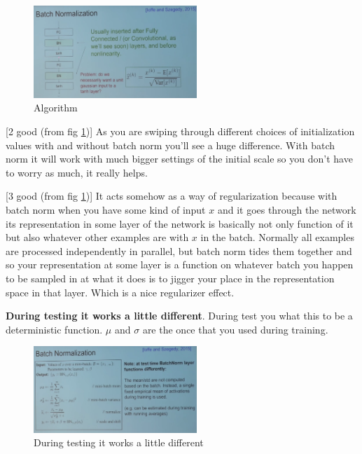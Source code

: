 \begin{figure}[h]
  \centering
  \includegraphics[width=0.55\textwidth]{Images/bn_layer/4.png}
  \caption{Algorithm}
  \label{fig:bn_layer_algorithm}
\end{figure}


[2 good (from fig \ref{fig:bn_layer_algorithm})] As you are swiping through different choices of initialization values with and without batch norm you'll see a huge difference. With batch norm it will work with much bigger settings of the initial scale so you don't have to worry as much, it really helps.

[3 good (from fig \ref{fig:bn_layer_algorithm})] It acts somehow as a way of regularization because with batch norm when you have some kind of input $x$ and it goes through the network its representation in some layer of the network is basically not only function of it but also whatever other examples are with $x$ in the batch. Normally all examples are processed independently in parallel, but batch norm tides them together and so your representation at some layer is a function on whatever batch you happen to be sampled in at what it does is to jigger your place in the representation space in that layer. Which is a nice regularizer effect.

\textbf{During testing it works a little different}. During test you what this to be a deterministic function. $\mu$ and $\sigma$ are the once that you used during training. 

\begin{figure}[h]
  \centering
  \includegraphics[width=0.55\textwidth]{Images/bn_layer/5.png}
  \caption{During testing it works a little different}
\end{figure}
